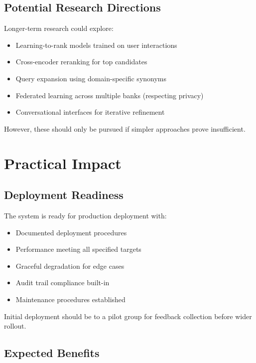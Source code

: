 \subsection{Potential Research Directions}

Longer-term research could explore:

\begin{itemize}[leftmargin=*,itemsep=2pt,topsep=2pt]
  \item Learning-to-rank models trained on user interactions
  \item Cross-encoder reranking for top candidates
  \item Query expansion using domain-specific synonyms
  \item Federated learning across multiple banks (respecting privacy)
  \item Conversational interfaces for iterative refinement
\end{itemize}

However, these should only be pursued if simpler approaches prove insufficient.

\section{Practical Impact}

\subsection{Deployment Readiness}

The system is ready for production deployment with:

\begin{itemize}[leftmargin=*,itemsep=2pt,topsep=2pt]
  \item Documented deployment procedures
  \item Performance meeting all specified targets
  \item Graceful degradation for edge cases
  \item Audit trail compliance built-in
  \item Maintenance procedures established
\end{itemize}

Initial deployment should be to a pilot group for feedback collection before wider rollout.

\subsection{Expected Benefits}

